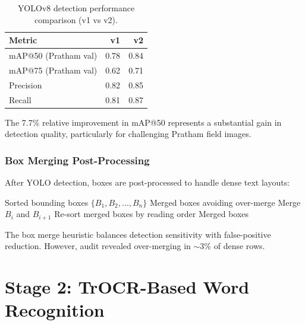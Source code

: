 \documentclass[14pt,a4paper]{article}
\begin{document}
\begin{table}[h]
    \centering
    \begin{tabular}{lrr}
        \toprule
        \textbf{Metric} & \textbf{v1} & \textbf{v2} \\
        \midrule
        mAP@50 (Pratham val) & 0.78 & 0.84 \\
        mAP@75 (Pratham val) & 0.62 & 0.71 \\
        Precision & 0.82 & 0.85 \\
        Recall & 0.81 & 0.87 \\
        \bottomrule
    \end{tabular}
    \caption{YOLOv8 detection performance comparison (v1 vs v2).}
\end{table}

The 7.7\% relative improvement in mAP@50 represents a substantial gain in detection quality, particularly for challenging Pratham field images.

\subsubsection{Box Merging Post-Processing}

After YOLO detection, boxes are post-processed to handle dense text layouts:

\begin{algorithm}
    \caption{Box Merge Algorithm for Dense Rows}
    \begin{algorithmic}[1]
        \Require Sorted bounding boxes $\{B_1, B_2, \ldots, B_n\}$
        \Ensure Merged boxes avoiding over-merge
                \State Merge $B_i$ and $B_{i+1}$
            \EndIf
        \EndFor
        \State Re-sort merged boxes by reading order
        \Return Merged boxes
    \end{algorithmic}
\end{algorithm}

The box merge heuristic balances detection sensitivity with false-positive reduction. However, audit revealed over-merging in $\sim$3\% of dense rows.
\newpage
\section{Stage 2: TrOCR-Based Word Recognition}
\end{document}
